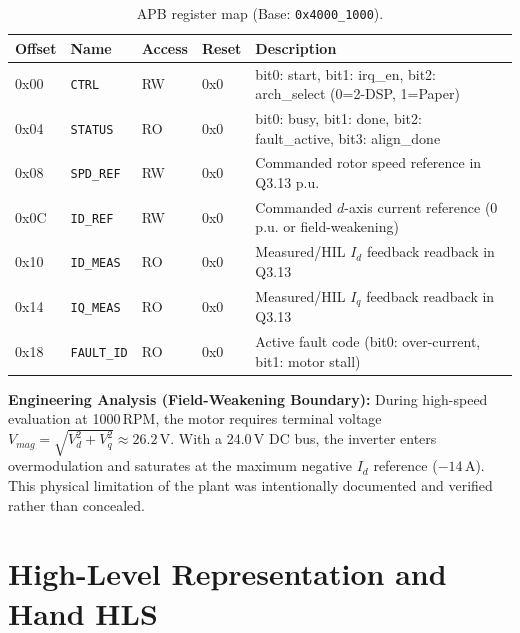 \documentclass[11pt,a4paper]{article}
\begin{document}
\begin{table}[H]\centering\small
\caption{APB register map (Base: \texttt{0x4000\_1000}).}\label{tab:regmap}
\begin{tabular}{@{}llllp{6.2cm}@{}}
\toprule
Offset & Name & Access & Reset & Description\\
\midrule
0x00 & \texttt{CTRL}      & RW & 0x0 & bit0: start, bit1: irq\_en, bit2: arch\_select (0=2-DSP, 1=Paper)\\
0x04 & \texttt{STATUS}    & RO & 0x0 & bit0: busy, bit1: done, bit2: fault\_active, bit3: align\_done\\
0x08 & \texttt{SPD\_REF}  & RW & 0x0 & Commanded rotor speed reference in Q3.13 p.u.\\
0x0C & \texttt{ID\_REF}   & RW & 0x0 & Commanded $d$-axis current reference (0 p.u. or field-weakening)\\
0x10 & \texttt{ID\_MEAS}  & RO & 0x0 & Measured/HIL $I_d$ feedback readback in Q3.13\\
0x14 & \texttt{IQ\_MEAS}  & RO & 0x0 & Measured/HIL $I_q$ feedback readback in Q3.13\\
0x18 & \texttt{FAULT\_ID} & RO & 0x0 & Active fault code (bit0: over-current, bit1: motor stall)\\
\bottomrule
\end{tabular}
\end{table}

\textbf{Engineering Analysis (Field-Weakening Boundary):} During high-speed evaluation at 1000\,RPM, the motor requires terminal voltage $V_{mag} = \sqrt{V_d^2 + V_q^2} \approx 26.2$\,V. With a 24.0\,V DC bus, the inverter enters overmodulation and saturates at the maximum negative $I_d$ reference ($-14$\,A). This physical limitation of the plant was intentionally documented and verified rather than concealed.

\section{High-Level Representation and Hand HLS}
\label{sec:hls}
\end{document}
